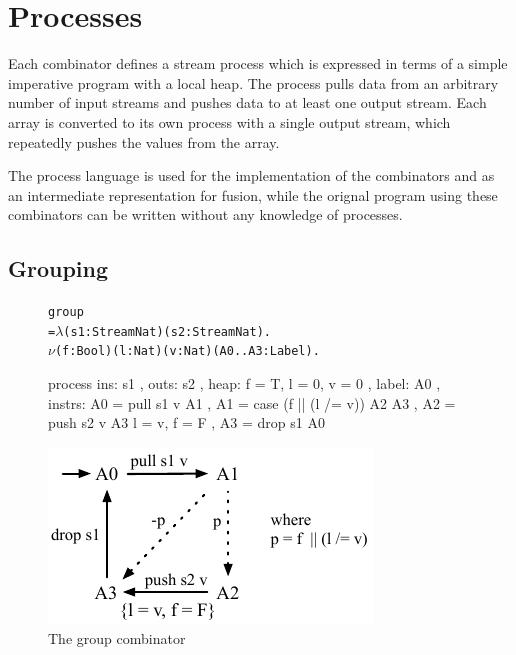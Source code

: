 \section{Processes}
\label{s:Processes}

Each combinator defines a stream process which is expressed in terms of a simple imperative program with a local heap.
The process pulls data from an arbitrary number of input streams and pushes data to at least one output stream.
Each array is converted to its own process with a single output stream, which repeatedly pushes the values from the array.

The process language is used for the implementation of the combinators and as an intermediate representation for fusion, while the orignal program using these combinators can be written without any knowledge of processes.


\subsection{Grouping}
\begin{figure}

\begin{center}
\begin{alltt}
           group 
             = \(\lambda\) (s1: Stream Nat) (s2: Stream Nat). 
               \(\nu\) (f: Bool) (l: Nat) (v: Nat) (A0..A3: Label).
\end{alltt}
\begin{code}
               process
               { ins:    { s1 }
               , outs:   { s2 }
               , heap:   { f = T, l = 0, v = 0 }
               , label:  A0
               , instrs: { A0 = pull s1 v            A1 {}
                         , A1 = case (f || (l /= v)) A2 {}  A3 {}
                         , A2 = push s2 v            A3 { l = v, f = F }
                         , A3 = drop s1              A0 {} } }
\end{code}
\end{center}
\vspace{1em}
\includegraphics[scale=1.1]{figures/state-group.pdf}
\caption{The group combinator}
\label{fig:Process:Group}
\end{figure}


